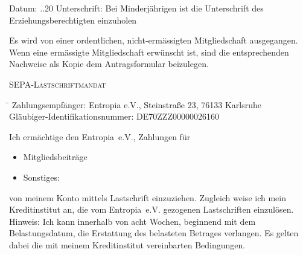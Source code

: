 \documentclass{scrartcl}
\begin{document}
Datum: \hspace{2pt} \underline{\hspace{20pt}}.\underline{\hspace{20pt}}.20\underline{\hspace{20pt}} Unterschrift: \hspace{2pt} \underline{\hspace{10cm}} 
\footnotesize
Bei Minderj\"ahrigen ist die Unterschrift des Erziehungsberechtigten einzuholen
\normalsize

\addvspace{0.2cm}

\footnotesize
Es wird von einer ordentlichen, nicht-erm\"assigten Mitgliedschaft ausgegangen. Wenn eine erm\"assigte Mitgliedschaft erw\"unscht ist, sind die
entsprechenden Nachweise als Kopie dem Antragsformular beizulegen.
\normalsize

\addvspace{1cm}
\begin{center}\begin{Large} \textsc{SEPA-Lastschriftmandat}\end{Large}\end{center}
\begin{tabbing}
\hspace*{7cm}\= \hspace*{7cm} \kill
Zahlungsempf\"anger: \> Entropia e.V., Steinstra{\ss}e 23, 76133 Karlsruhe\\

Gl\"aubiger-Identifikationsnummer: \> DE70ZZZ00000026160
\end{tabbing}
Ich erm\"achtige den Entropia~e.\thinspace V., Zahlungen f\"ur

\begin{itemize}
  \item[\Square] Mitgliedsbeitr\"age
  \item[\Square] Sonstiges: \hrulefill
\end{itemize}

von meinem Konto mittels Lastschrift einzuziehen. Zugleich weise ich mein Kreditinstitut an, die vom Entropia~e.\thinspace V. gezogenen Lastschriften einzul\"osen.\\

\footnotesize
Hinweis: Ich kann innerhalb von acht Wochen, beginnend mit dem Belastungsdatum, die Erstattung des belasteten Betrages verlangen. Es gelten dabei die mit meinem Kreditinstitut vereinbarten Bedingungen.
\normalsize
\end{document}
